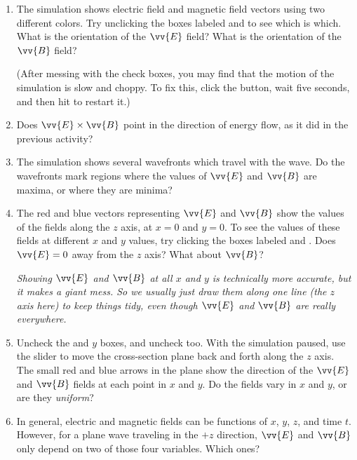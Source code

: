 \pagebreak[2]
\begin{enumerate}[labparts]
\item The simulation shows electric field and magnetic field vectors using two different colors.  Try unclicking the boxes labeled  and  to see which is which.  What is the orientation of the $\vv {E}$ field?
What is the orientation of the $\vv {B}$ field?
\answerspace{15mm}

(After messing with the check boxes, you may find that the motion of the simulation is slow and choppy.  To fix this, click the  button, wait five seconds, and then hit  to restart it.)

\item Does $\vv {E} \times \vv {B}$ point in the direction of energy flow, 
as it did in the previous activity?
\answerspace{10mm}

\item The simulation shows several wavefronts which travel with the wave.  Do the wavefronts mark regions where the values of $\vv {E}$ and $\vv {B}$ are maxima, or where they are minima?
\answerspace{15mm}

\item The red and blue vectors representing $\vv {E}$ and $\vv {B}$ show the values of the fields along the $z$ axis, at $x=0$ and $y=0$.  To see the values of these fields at different $x$ and $y$ values, try clicking the boxes labeled  and .  Does $\vv {E}=0$ away from the $z$ axis?  What about $\vv {B}$?
\answerspace{10mm}

\textit{Showing  $\vv {E}$ and $\vv {B}$ at all $x$ and $y$ is technically more accurate, but it makes a giant mess.  So we usually just draw them along one line (the $z$ axis here) to keep things tidy, even though $\vv {E}$ and $\vv {B}$ are really everywhere.}

\item Uncheck the  and $y$ boxes, and uncheck  too.  With the simulation paused, use the slider to move the cross-section plane back and forth along the $z$ axis.  The small red and blue arrows in the plane show the direction of the $\vv {E}$ and $\vv {B}$ fields at each point in $x$ and $y$.  Do the fields vary in $x$ and $y$, or are they \textit{uniform}?
\answerspace{10mm}

\item In general, electric and magnetic fields can be functions of $x$, $y$, $z$, and time $t$. However, for a plane wave traveling in the $+z$ direction, $\vv {E}$ and $\vv {B}$ only depend on two of those four variables.  Which ones?
\answerspace{10mm}


\end{enumerate}
